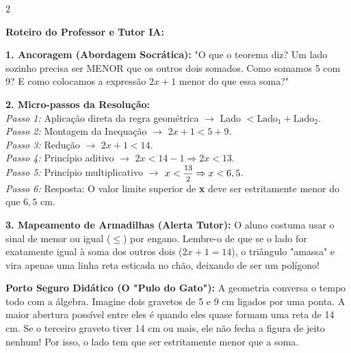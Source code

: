 \begin{multicols*}{2}
\ifgabarito
    \begin{tcolorbox}[colback=CorTitUm!5, colframe=CorTitUm, boxrule=1pt, arc=4pt, left=6pt, right=6pt, top=6pt, bottom=6pt]
    \small\textbf{\textcolor{CorTitUm}{Roteiro do Professor e Tutor IA:}}\par\vspace{0.1cm}
    \color{CinzaEscuro}
    \textbf{1. Ancoragem (Abordagem Socrática):} "O que o teorema diz? Um lado sozinho precisa ser MENOR que os outros dois somados. Como somamos 5 com 9? E como colocamos a expressão $2x+1$ menor do que essa soma?"\par\vspace{0.1cm}
    
    \textbf{2. Micro-passos da Resolução:}\\
    \textit{Passo 1:} Aplicação direta da regra geométrica $\rightarrow$ Lado $< \text{Lado}_1 + \text{Lado}_2$.\\
    \textit{Passo 2:} Montagem da Inequação $\rightarrow$ $2x + 1 < 5 + 9$.\\
    \textit{Passo 3:} Redução $\rightarrow$ $2x + 1 < 14$.\\
    \textit{Passo 4:} Princípio aditivo $\rightarrow$ $2x < 14 - 1 \Rightarrow 2x < 13$.\\
    \textit{Passo 5:} Princípio multiplicativo $\rightarrow$ $x < \mfrac{13}{2} \Rightarrow x < 6,5$.\\
    \textit{Passo 6:} Resposta: O valor limite superior de \textbf{x} deve ser estritamente menor do que $6,5 \text{ cm}$.\par\vspace{0.1cm}
    
    \textbf{3. Mapeamento de Armadilhas (Alerta Tutor):} O aluno costuma usar o sinal de menor ou igual ($\le$) por engano. Lembre-o de que se o lado for exatamente igual à soma dos outros dois ($2x+1 = 14$), o triângulo "amassa" e vira apenas uma linha reta esticada no chão, deixando de ser um polígono!
    \end{tcolorbox}
    \vspace{0.15cm}
    
    \begin{boxexplicacao}
    \textbf{Porto Seguro Didático (O "Pulo do Gato"):} A geometria conversa o tempo todo com a álgebra. Imagine dois gravetos de 5 e 9 cm ligados por uma ponta. A maior abertura possível entre eles é quando eles quase formam uma reta de 14 cm. Se o terceiro graveto tiver 14 cm ou mais, ele não fecha a figura de jeito nenhum! Por isso, o lado tem que ser estritamente menor que a soma.
    \end{boxexplicacao}
\fi


\end{multicols*}
